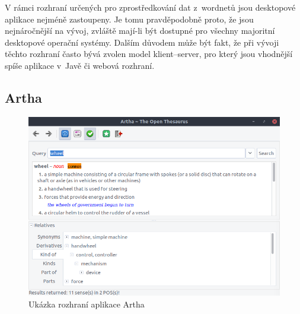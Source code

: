\documentclass[a4paper,11pt,openany,twoside]{book}
\begin{document}
			V rámci rozhraní určených pro zprostředkování dat z~wordnetů jsou desktopové aplikace nejméně zastoupeny. Je tomu pravděpodobně proto, že jsou nejnáročnější na vývoj, zvláště mají-li být dostupné pro všechny majoritní desktopové operační systémy. Dalším důvodem může být fakt, že při vývoji těchto rozhraní často bývá zvolen model klient--server, pro který jsou vhodnější spíše aplikace v~Javě \parencite[13]{gosling1995java} či webová rozhraní.

			\subsection{Artha}

				\begin{figure}[h]
					\centering
					\includegraphics[width=1.0\textwidth]{wnartha-ubuntu.png}
					\caption{Ukázka rozhraní aplikace Artha}
					\label{fig:wnartha-ubuntu}
				\end{figure}
\end{document}

